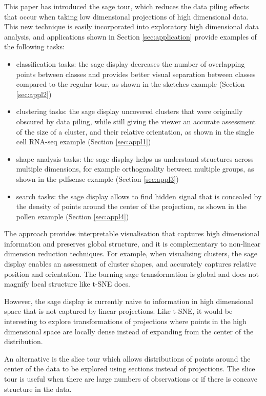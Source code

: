 \documentclass[]{interact}
\theoremstyle{plain}%
\theoremstyle{definition}
\theoremstyle{remark}
\def\tightlist{}
\begin{document}
This paper has introduced the sage tour, which reduces the data piling
effects that occur when taking low dimensional projections of high
dimensional data. This new technique is easily incorporated into
exploratory high dimensional data analysis, and applications shown in
Section \ref{sec:application} provide examples of the following tasks:

\begin{itemize}
\tightlist
\item
  classification tasks: the sage display decreases the number of
  overlapping points between classes and provides better visual
  separation between classes compared to the regular tour, as shown in
  the sketches example (Section \ref{sec:appl2})
\item
  clustering tasks: the sage display uncovered clusters that were
  originally obscured by data piling, while still giving the viewer an
  accurate assessment of the size of a cluster, and their relative
  orientation, as shown in the single cell RNA-seq example (Section
  \ref{sec:appl1})
\item
  shape analysis tasks: the sage display helps us understand structures
  across multiple dimensions, for example orthogonality between multiple
  groups, as shown in the pdfsense example (Section \ref{sec:appl3})
\item
  search tasks: the sage display allows to find hidden signal that is
  concealed by the density of points around the center of the
  projection, as shown in the pollen example (Section \ref{sec:appl4})
\end{itemize}

The approach provides interpretable visualisation that captures high
dimensional information and preserves global structure, and it is
complementary to non-linear dimension reduction techniques. For example,
when visualising clusters, the sage display enables an assessment of
cluster shapes, and accurately captures relative position and
orientation. The burning sage transformation is global and does not
magnify local structure like t-SNE does.

However, the sage display is currently naive to information in high
dimensional space that is not captured by linear projections. Like
t-SNE, it would be interesting to explore transformations of projections
where points in the high dimensional space are locally dense instead of
expanding from the center of the distribution.

An alternative is the slice tour \citep{sliceTour} which allows
distributions of points around the center of the data to be explored
using sections instead of projections. The slice tour is useful when
there are large numbers of observations or if there is concave structure
in the data.
\end{document}

